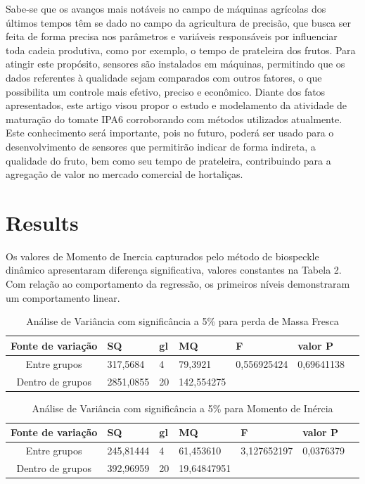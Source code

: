 \documentclass[journal,article,submit,moreauthors,pdftex,10pt,a4paper]{mdpi}
\theoremstyle{mdpi}
\newcounter{ex}
\newcounter{re}
\theoremstyle{mdpidefinition}
\begin{document}
Sabe-se que os avanços mais notáveis no campo de máquinas agrícolas dos últimos tempos têm se dado no campo da agricultura de precisão, que busca ser feita de forma precisa nos parâmetros e variáveis responsáveis por influenciar toda cadeia produtiva, como por exemplo, o tempo de prateleira dos frutos. Para atingir este propósito, sensores são instalados em máquinas, permitindo que os dados referentes à qualidade sejam comparados com outros fatores, o que possibilita um controle mais efetivo, preciso e econômico.
Diante dos fatos apresentados, este artigo visou propor o estudo e modelamento da atividade de maturação do tomate IPA6 corroborando com métodos utilizados atualmente. Este conhecimento será importante, pois no futuro, poderá ser usado para o desenvolvimento de sensores que permitirão indicar de forma indireta, a qualidade do fruto, bem como seu tempo de prateleira, contribuindo para a agregação de valor no mercado comercial de hortaliças. 

\section{Results}

Os valores de Momento de Inercia capturados pelo método de biospeckle dinâmico apresentaram diferença significativa, valores constantes na Tabela 2. Com relação ao comportamento da regressão, os primeiros níveis demonstraram um comportamento linear.

\begin{table}[ht]\footnotesize
\centering
\caption{Análise de Variância com significância a 5\% para perda de Massa Fresca}
\label{anova_massa}
\begin{tabular}{|c|l|l|l|l|l|l|}
\hline
Fonte de variação & SQ       & gl & MQ         & F           & valor P                         \\ \hline
Entre grupos      & 317,5684 & 4  & 79,3921   & 0,556925424 & {\color[HTML]{FD6864} 0,69641138}\\ \hline
Dentro de grupos  & 2851,0855 & 20 & 142,554275 &             &                            \\ \hline
\end{tabular}
\end{table}

\begin{table}[ht]\footnotesize
\centering
\caption{Análise de Variância com significância a 5\% para Momento de Inércia}
\label{anova_mi}
\begin{tabular}{|c|l|l|l|l|l|l|}
\hline
Fonte de variação & SQ       & gl & MQ         & F           & valor P                            \\ \hline
Entre grupos& 245,81444 & 4  & 61,453610  & 3,127652197 & {\color[HTML]{FD6864} 0,0376379}\\ \hline
Dentro de grupos  & 392,96959 & 20 & 19,64847951
 &             &                            \\ \hline
\end{tabular}
\end{table}
\end{document}
